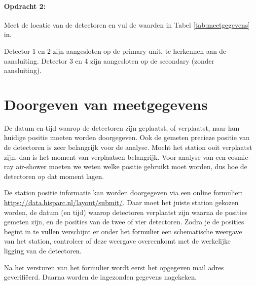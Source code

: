 \paragraph{Opdracht 2:}

Meet de locatie van de detectoren en vul de waarden in Tabel
\ref{tab:meetgegevens} in.

Detector 1 en 2 zijn aangesloten op de \hisparc primary unit, te herkennen aan
de \gps aansluiting. Detector 3 en 4 zijn aangesloten op de \hisparc secondary
(zonder \gps aansluiting).


\section{Doorgeven van meetgegevens}

De datum en tijd waarop de detectoren zijn geplaatst, of verplaatst,
naar hun huidige positie moeten worden doorgegeven. Ook de gemeten
precieze positie van de detectoren is zeer belangrijk voor de analyse.
Mocht het station ooit verplaatst zijn, dan is het moment van
verplaatsen belangrijk. Voor analyse van een cosmic-ray air-shower
moeten we weten welke positie gebruikt moet worden, dus hoe de
detectoren op dat moment lagen.

De station positie informatie kan worden doorgegeven via een online
formulier: \url{https://data.hisparc.nl/layout/submit/}. Daar moet het
juiste station gekozen worden, de datum (en tijd) waarop detectoren
verplaatst zijn waarna de posities gemeten zijn, en de posities van de
twee of vier detectoren. Zodra je de posities begint in te vullen
verschijnt er onder het formulier een schematische weergave van het
station, controleer of deze weergave overeenkomt met de werkelijke
ligging van de detectoren.

Na het versturen van het formulier wordt eerst het opgegeven mail adres
geverifiëerd. Daarna worden de ingezonden gegevens nagekeken.


